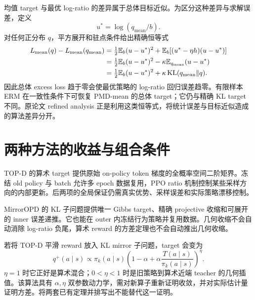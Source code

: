 均值 target 与最优 log-ratio 的差异属于总体目标近似。为区分这种差异与求解误差，定义
\[u^*=\log(q_{\mathrm{mean}}/b).\]
对任何正分布 $q$，平方展开和驻点条件给出精确恒等式
\begin{align}
 L_{\mathrm{mean}}(q)-L_{\mathrm{mean}}(q_{\mathrm{mean}})
 &=\tfrac12\mathbb{E}_b(u-u^*)^2+\mathbb{E}_b[(u^*-\eta h)(u-u^*)]\\
 &=\tfrac12\mathbb{E}_b(u-u^*)^2-\kappa\mathbb{E}_{q_{\mathrm{mean}}}(u-u^*)\\
 &=\tfrac12\mathbb{E}_b(u-u^*)^2+\kappa\operatorname{KL}(q_{\mathrm{mean}}\Vert q).
 \label{eq:pmdmean-excess-identity}
\end{align}
因此总体 excess loss 趋于零会使最优策略的 log-ratio 回归误差趋零。有限样本 ERM 在一致性条件下可恢复 PMD-mean 的总体 target；它仍与精确 KL target 不同。原论文 refined analysis 正是利用这类恒等式，将统计误差与目标近似造成的算法差异分开。

\section{两种方法的收益与组合条件}

TOP-D 的算术 target 提供原始 on-policy token 梯度的全概率空间二阶矩界。冻结 old policy 与 batch 允许多 epoch 数据复用，PPO ratio 机制控制某些采样方向的内部更新。后两项的全局保证仍需真实优势、采样误差和实际策略漂移控制。

MirrorOPD 的 KL 子问题提供唯一 Gibbs target、精确 projective 收缩和可展开的 inner 误差递推。它也能在 outer 内冻结行为策略并复用数据。几何收缩不会自动消除 log-ratio 负尾，算术 reward 的方差定理也不会自动推出几何收缩。

若将 TOP-D 平滑 reward 放入 KL mirror 子问题，target 会变为
\[
 q^+(a\mid s)\propto\pi_k(a\mid s)
 \left(1-\alpha+\alpha\frac{T(a\mid s)}{\pi_k(a\mid s)}\right)^\eta.
\]
$\eta=1$ 时它正好是算术混合；$0<\eta<1$ 时是旧策略到算术近端 teacher 的几何插值。该算法具有 $\alpha,\eta$ 双参数动力学，需对新算子重新证明收敛，并对实际估计量证明方差。将两套已有定理并排写出不能替代这一证明。

